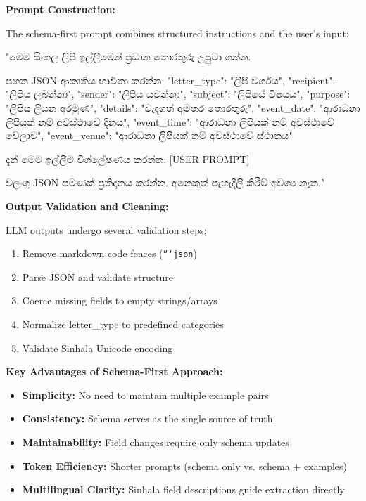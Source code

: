 \documentclass[12pt]{uomthesis}
\begin{document}
\textbf{Prompt Construction:}

The schema-first prompt combines structured instructions and the user's input:

\begin{SinhalaVerbatim}
"මෙම සිංහල ලිපි ඉල්ලීමෙන් ප්‍රධාන තොරතුරු උපුටා ගන්න.

පහත JSON ආකෘතිය භාවිතා කරන්න:
{
    "letter_type": "ලිපි වර්ගය",
    "recipient": "ලිපිය ලබන්නා",
    "sender": "ලිපිය යවන්නා",
    "subject": "ලිපියේ විෂයය",
    "purpose": "ලිපිය ලියන අරමුණ",
    "details": "වැදගත් අමතර තොරතුරු",
    "event_date": "ආරාධනා ලිපියක් නම් අවස්ථාවේ දිනය",
    "event_time": "ආරාධනා ලිපියක් නම් අවස්ථාවේ වේලාව",
    "event_venue": "ආරාධනා ලිපියක් නම් අවස්ථාවේ ස්ථානය"
}

දැන් මෙම ඉල්ලීම විශ්ලේෂණය කරන්න:
[USER PROMPT]

වලංගු JSON පමණක් ප්‍රතිදානය කරන්න. අනෙකුත් පැහැදිලි කිරීම් අවශ්‍ය නැත."
\end{SinhalaVerbatim}

\textbf{Output Validation and Cleaning:}

LLM outputs undergo several validation steps:
\begin{enumerate}
    \item Remove markdown code fences (\texttt{```json})
    \item Parse JSON and validate structure
    \item Coerce missing fields to empty strings/arrays
    \item Normalize letter\_type to predefined categories
    \item Validate Sinhala Unicode encoding
\end{enumerate}

\textbf{Key Advantages of Schema-First Approach:}

\begin{itemize}
    \item \textbf{Simplicity:} No need to maintain multiple example pairs
    \item \textbf{Consistency:} Schema serves as the single source of truth
    \item \textbf{Maintainability:} Field changes require only schema updates
    \item \textbf{Token Efficiency:} Shorter prompts (schema only vs. schema + examples)
    \item \textbf{Multilingual Clarity:} Sinhala field descriptions guide extraction directly
\end{itemize}
\end{document}
